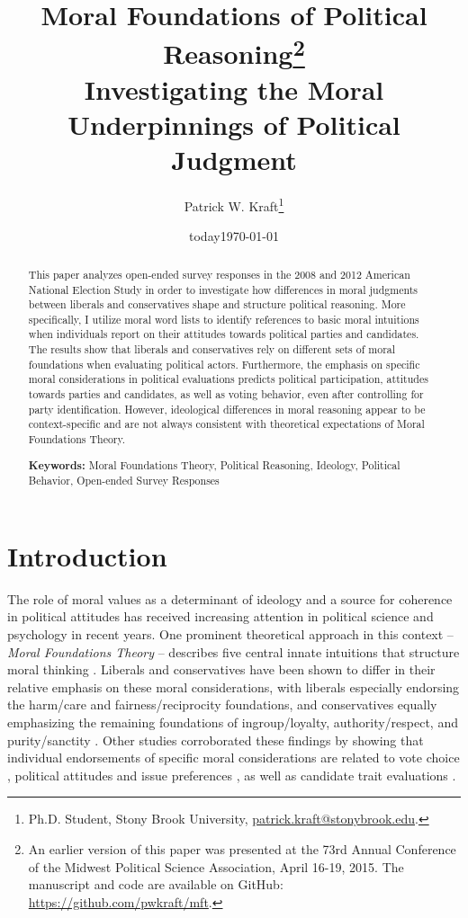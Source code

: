 \documentclass[12pt]{article}
\author{Patrick W. Kraft\footnote{Ph.D. Student, Stony Brook University, \href{mailto:patrick.kraft@stonybrook.edu}{patrick.kraft@stonybrook.edu}.
}}
\date{today}
\title{Moral Foundations of Political Reasoning\footnote{An earlier version of this paper was presented at the 73rd Annual Conference of the Midwest Political Science Association, April 16-19, 2015. The manuscript and code are available on GitHub: \url{https://github.com/pwkraft/mft}.}\\
\large{Investigating the Moral Underpinnings of Political Judgment}}
\date{\today}
\begin{document}
\maketitle
\onehalfspacing

\begin{abstract}
This paper analyzes open-ended survey responses in the 2008 and 2012 American National Election Study in order to investigate how differences in moral judgments between liberals and conservatives shape and structure political reasoning. More specifically, I utilize moral word lists to identify references to basic moral intuitions when individuals report on their attitudes towards political parties and candidates. The results show that liberals and conservatives rely on different sets of moral foundations when evaluating political actors. Furthermore, the emphasis on specific moral considerations in political evaluations predicts political participation, attitudes towards parties and candidates, as well as voting behavior, even after controlling for party identification. However, ideological differences in moral reasoning appear to be context-specific and are not always consistent with theoretical expectations of Moral Foundations Theory.

\vspace{\baselineskip}
\noindent \textbf{Keywords:} Moral Foundations Theory, Political Reasoning, Ideology, Political Behavior, Open-ended Survey Responses
\end{abstract}
\newpage


\section{Introduction}

The role of moral values as a determinant of ideology and a source for coherence in political attitudes has received increasing attention in political science and psychology in recent years. One prominent theoretical approach in this context -- \textit{Moral Foundations Theory} -- describes five central innate intuitions that structure moral thinking \citep{haidt2008moral}. Liberals and conservatives have been shown to differ in their relative emphasis on these moral considerations, with liberals especially endorsing the harm/care and fairness/reciprocity foundations, and conservatives equally emphasizing the remaining foundations of ingroup/loyalty, authority/respect, and purity/sanctity \citep{graham2009liberals}. Other studies corroborated these findings by showing that individual endorsements of specific moral considerations are related to vote choice \citep{iyer2010beyond, franks2015using}, political attitudes and issue preferences \citep{koleva2012tracing, low2015moral, clifford2015concerns}, as well as candidate trait evaluations \citep{clifford2014linking}.
\end{document}
